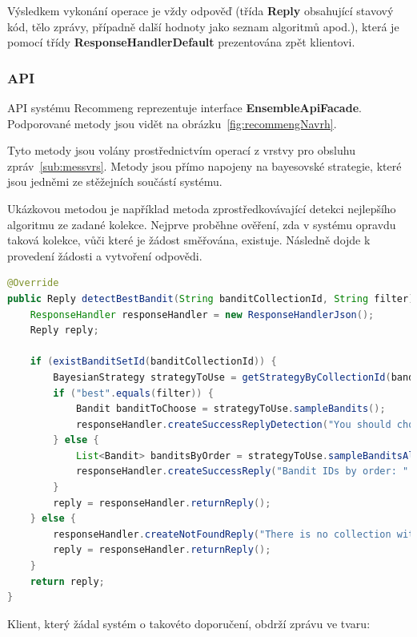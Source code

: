 \documentclass[thesis=M,czech]{FITthesis}[2014/05/07]
\begin{document}
Výsledkem vykonání operace je vždy odpověď (třída \textbf{Reply} obsahující stavový kód, tělo zprávy, případně další hodnoty jako seznam algoritmů apod.), která je pomocí třídy \textbf{ResponseHandlerDefault} prezentována zpět klientovi.

\subsubsection{API}
API systému Recommeng reprezentuje interface \textbf{EnsembleApiFacade}. Podporované metody jsou vidět na obrázku~\ref{fig:recommengNavrh}.

Tyto metody jsou volány prostřednictvím operací z vrstvy pro obsluhu zpráv~\ref{sub:messvrs}. Metody jsou přímo napojeny na bayesovské strategie, které jsou jedněmi ze stěžejních součástí systému.

Ukázkovou metodou je například metoda zprostředkovávající detekci nejlepšího algoritmu ze zadané kolekce. Nejprve proběhne ověření, zda v systému opravdu taková kolekce, vůči které je žádost směřována, existuje. Následně dojde k provedení žádosti a vytvoření odpovědi.

\begin{lstlisting}[language=java]
@Override
public Reply detectBestBandit(String banditCollectionId, String filter) {
    ResponseHandler responseHandler = new ResponseHandlerJson();
    Reply reply;

    if (existBanditSetId(banditCollectionId)) {
        BayesianStrategy strategyToUse = getStrategyByCollectionId(banditCollectionId);
        if ("best".equals(filter)) {
            Bandit banditToChoose = strategyToUse.sampleBandits();            
            responseHandler.createSuccessReplyDetection("You should choose bandit with name " + banditToChoose.getName() + " now. He is the best for this context.", banditToChoose.getId(), banditToChoose.getName(), strategyToUse.getId());
        } else {
            List<Bandit> banditsByOrder = strategyToUse.sampleBanditsAll(banditCollectionId);
            responseHandler.createSuccessReply("Bandit IDs by order: " + banditsByOrder.toString());
        }
        reply = responseHandler.returnReply();
    } else {
        responseHandler.createNotFoundReply("There is no collection with ID " + banditCollectionId + " in application.");
        reply = responseHandler.returnReply();
    }
    return reply;
}
\end{lstlisting}

Klient, který žádal systém o takovéto doporučení, obdrží zprávu ve tvaru:
\end{document}

